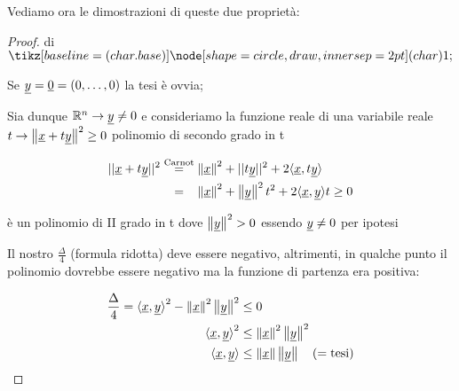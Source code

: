 Vediamo ora le dimostrazioni di queste due proprietà:

\begin{proof} di \(\circled{1}\)

    Se \(\underline{y} = \underline{0} = (0, \ldots ,0)\) la tesi è ovvia;

    Sia dunque \(\mathbb{R}^{n} \rightarrow \underline{y} \neq 0\) e consideriamo la funzione reale di una variabile reale \(t \rightarrow \left\lVert\underline{x}+t\underline{y}\right\rVert^{2}\ge 0\) polinomio di secondo grado in t

    \begin{align*}
        ||\underline{x} + t\underline{y}|| ^{2} & \overset{\text{Carnot}}{=} \left\lVert\underline{x}\right\rVert^{2} + ||t\underline{y}||^{2} + 2\langle \underline{x},t\underline{y} \rangle \\
                            & ~~\, = ~~\, \left\lVert\underline{x}\right\rVert^{2} + \left\lVert\underline{y}\right\rVert^{2}t^{2} + 2 \langle\underline{x},\underline{y}\rangle t \ge 0
    \end{align*}

    è un polinomio di II grado in t dove \(\left\lVert\underline{y}\right\rVert^{2}> 0 \) essendo \(\underline{y} \neq 0\) per ipotesi

    Il nostro \(\frac{\Delta}{4}\) (formula ridotta) deve essere negativo, altrimenti, in qualche punto il polinomio dovrebbe essere negativo ma la funzione di partenza era positiva:

    \begin{align*}
        \frac{\Delta}{4} = {\langle\underline{x},\underline{y}\rangle}^{2} - \left\lVert\underline{x}\right\rVert^{2}\left\lVert\underline{y}\right\rVert^{2} & \le 0                                       \\
        {\langle\underline{x},\underline{y}\rangle}^{2}                                               & \le \left\lVert\underline{x}\right\rVert^{2}\left\lVert\underline{y}\right\rVert^{2}                \\
        \langle\underline{x},\underline{y}\rangle                                                     & \le \left\lVert\underline{x}\right\rVert \left\lVert\underline{y}\right\rVert \quad (= \text{tesi})
    \end{align*}

\end{proof}

\filbreak{}

